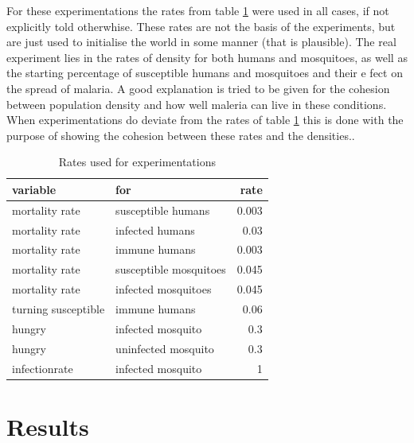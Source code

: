 \documentclass[a4paper]{report}
\begin{document}
For these experimentations the rates from table \ref{tab:rates} were used in all
cases, if not explicitly told otherwhise. These rates are not the basis of the
experiments, but are just used to initialise the world in some manner (that is
plausible). The real experiment lies in the rates of density for both
humans and mosquitoes, as well as the starting percentage of susceptible
humans and mosquitoes and their e fect on the spread of malaria. A good
explanation  is 
tried to be given for the cohesion between population density and how well maleria can live in these conditions.
When experimentations do deviate from the rates of table \ref{tab:rates} this is
done with the purpose of showing the cohesion between these rates and the
densities..

\begin{table}
\centering
\begin{tabular}{|l|l|r|}
        \hline
        variable&for&rate\\
        \hline
        mortality rate&susceptible humans &0.003\\
        mortality rate&infected humans&0.03\\
        mortality rate&immune humans&0.003\\
        mortality rate&susceptible mosquitoes&0.045\\
        mortality rate&infected mosquitoes&0.045\\
        turning susceptible&immune humans& 0.06\\
        hungry&infected mosquito  & 0.3\\
        hungry&uninfected mosquito& 0.3\\
        infectionrate&infected mosquito& 1\\
        \hline
\end{tabular}
\caption{Rates used for experimentations }
\label{tab:rates}
\end{table}

\section{Results}
\end{document}
